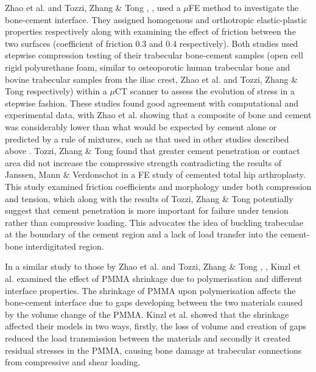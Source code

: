 Zhao et al. and Tozzi, Zhang \& Tong \cite{Zhao2012}, \cite{Tozzi2012}, used a
$\mu$FE
method to investigate the bone-cement interface. They assigned
homogenous and orthotropic elastic-plastic properties respectively along
with examining the effect of friction between the two surfaces
(coefficient of friction 0.3 and 0.4 respectively). Both studies used
stepwise compression testing of their trabecular bone-cement samples
(open cell rigid polyurethane foam, similar to osteoporotic human
trabecular bone and bovine trabecular samples from the iliac crest, Zhao
et al. and Tozzi, Zhang \& Tong respectively) within a $\mu$CT scanner to
assess the evolution of stress in a stepwise fashion. These studies
found good agreement with computational and experimental data, with Zhao
et al. showing that a composite of bone and cement was considerably
lower than what would be expected by cement alone or predicted by a rule
of mixtures, such as that used in other studies described above
\cite{Chevalier2008}. Tozzi, Zhang \& Tong found that greater cement
penetration or
contact area did not increase the compressive strength contradicting the
results of Janssen, Mann \& Verdonschot \cite{Janssen2008} in a FE study of
cemented total hip arthroplasty. This study examined friction
coefficients and morphology under both compression and tension, which
along with the results of Tozzi, Zhang \& Tong potentially suggest that
cement penetration is more important for failure under tension rather
than compressive loading. This advocates the idea of buckling trabeculae
at the boundary of the cement region and a lack of load transfer into
the cement-bone interdigitated region.

In a similar study to those by Zhao et al. and Tozzi, Zhang \& Tong \cite{Zhao2012},
\cite{Tozzi2012}, Kinzl et al. \cite{Kinzl2012a} examined the effect
of PMMA
shrinkage due to polymerisation and different interface properties. The
shrinkage of PMMA upon polymerisation affects the bone-cement interface
due to gaps developing between the two materials caused by the volume
change of the PMMA. Kinzl et al. showed that the shrinkage affected
their models in two ways, firstly, the loss of volume and creation of
gaps reduced the load transmission between the materials and secondly it
created residual stresses in the PMMA, causing bone damage at trabecular
connections from compressive and shear loading.

